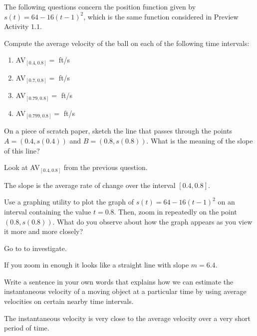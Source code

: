 \documentclass{ximera}
\begin{document}
\begin{question} 
The following questions concern the position function given by $s(t) = 64 - 16(t-1)^2$, which is the same function considered in Preview Activity $1.1$.

Compute the average velocity of the ball on each of the following time intervals:  
\begin{enumerate}
\item AV$_{[0.4,0.8]}=$  ft/s
\item AV$_{[0.7,0.8]}=$  ft/s
\item AV$_{[0.79,0.8]}=$  ft/s
\item AV$_{[0.799,0.8]}=$  ft/s 
\end{enumerate}

On a piece of scratch paper, sketch the line that passes through the points $A=(0.4, s(0.4))$ and $B=(0.8, s(0.8))$.  What is the meaning of the slope of this line?  
\begin{solution}
\begin{hint}
Look at AV$_{[0.4,0.8]}$ from the previous question. 
\end{hint}
\begin{freeResponse}
The slope is the average rate of change over the interval $[0.4,0.8]$.
\end{freeResponse}
\end{solution}

Use a graphing utility to plot the graph of $s(t) = 64 - 16(t-1)^2$ on an interval containing the value $t = 0.8$.  Then, zoom in repeatedly on the point $(0.8, s(0.8))$.  What do you observe about how the graph appears as you view it more and more closely?  
\begin{solution}
\begin{hint}
Go to  to investigate.
\end{hint}
\begin{freeResponse}
If you zoom in enough it looks like a straight line with slope $m=6.4$.
\end{freeResponse}
\end{solution}
\end{question}

\begin{question}
Write a sentence in your own words that explains how we can estimate the instantaneous velocity of a moving object at a particular time by using average velocities on certain nearby time intervals.

\begin{freeResponse}
The instantaneous velocity is very close to the average velocity over a very short period of time.
\end{freeResponse}
\end{question}
\end{document}
